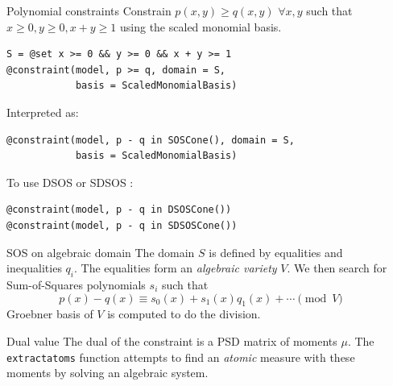 \documentclass[final]{beamer}
\newlength{\sepwid}
\newlength{\onecolwid}
\begin{document}
\begin{frame}[t,fragile]
\begin{columns}[t]
\begin{column}{\onecolwid}
  \begin{block}{Polynomial constraints}
    Constrain $p(x, y) \geq q(x, y)$ $\forall x, y$ such that $x \ge 0, y \ge 0, x + y \ge 1$ using the scaled monomial basis.
\begin{verbatim}
S = @set x >= 0 && y >= 0 && x + y >= 1
@constraint(model, p >= q, domain = S,
            basis = ScaledMonomialBasis)
\end{verbatim}
    Interpreted as:
\begin{verbatim}
@constraint(model, p - q in SOSCone(), domain = S,
            basis = ScaledMonomialBasis)
\end{verbatim}
    To use DSOS or SDSOS \cite{ahmadi2017dsos}:
\begin{verbatim}
@constraint(model, p - q in DSOSCone())
@constraint(model, p - q in SDSOSCone())
\end{verbatim}
  \begin{alertblock}{SOS on algebraic domain}
    The domain $S$ is defined by equalities and inequalities $q_i$.
    The equalities form an \emph{algebraic variety} $V$.
    We then search for Sum-of-Squares polynomials $s_i$ such that
    \[ p(x) - q(x) \equiv s_0(x) + s_1(x) q_1(x) + \cdots \pmod{V} \]
    Groebner basis of $V$ is computed to do the division.
  \end{alertblock}
  \end{block}

  \begin{block}{Dual value}
    The dual of the constraint is a PSD matrix of moments $\mu$.
    The \texttt{extractatoms} function attempts to find an \emph{atomic} measure
    with these moments by solving an algebraic system.
  \end{block}
\end{column}

\begin{column}{\sepwid}\end{column} %


\end{columns}
\end{frame}
\end{document}
